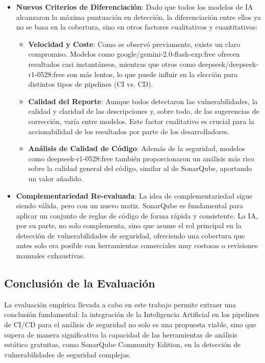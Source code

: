 \begin{itemize}
    \item \textbf{Nuevos Criterios de Diferenciación}: Dado que todos los modelos de IA alcanzaron la máxima puntuación en detección, la diferenciación entre ellos ya no se basa en la cobertura, sino en otros factores cualitativos y cuantitativos:
        \begin{itemize}
            \item \textbf{Velocidad y Coste}: Como se observó previamente, existe un claro compromiso. Modelos como google/gemini-2.0-flash-exp:free ofrecen resultados casi instantáneos, mientras que otros como deepseek/deepseek-r1-0528:free son más lentos, lo que puede influir en la elección para distintos tipos de pipelines (CI vs. CD).
            \item \textbf{Calidad del Reporte}: Aunque todos detectaron las vulnerabilidades, la calidad y claridad de las descripciones y, sobre todo, de las sugerencias de corrección, varía entre modelos. Este factor cualitativo es crucial para la accionabilidad de los resultados por parte de los desarrolladores.
            \item \textbf{Análisis de Calidad de Código}: Además de la seguridad, modelos como deepseek-r1-0528:free también proporcionaron un análisis más rico sobre la calidad general del código, similar al de SonarQube, aportando un valor añadido.
        \end{itemize}

    \item \textbf{Complementariedad Re-evaluada}: La idea de complementariedad sigue siendo válida, pero con un nuevo matiz. SonarQube es fundamental para aplicar un conjunto de reglas de código de forma rápida y consistente. La IA, por su parte, no solo complementa, sino que asume el rol principal en la detección de vulnerabilidades de seguridad, ofreciendo una cobertura que antes solo era posible con herramientas comerciales muy costosas o revisiones manuales exhaustivas.
\end{itemize}

\subsection{Conclusión de la Evaluación}

La evaluación empírica llevada a cabo en este trabajo permite extraer una conclusión fundamental: la integración de la Inteligencia Artificial en los pipelines de CI/CD para el análisis de seguridad no solo es una propuesta viable, sino que supera de manera significativa la capacidad de las herramientas de análisis estático gratuitas, como SonarQube Community Edition, en la detección de vulnerabilidades de seguridad complejas.

